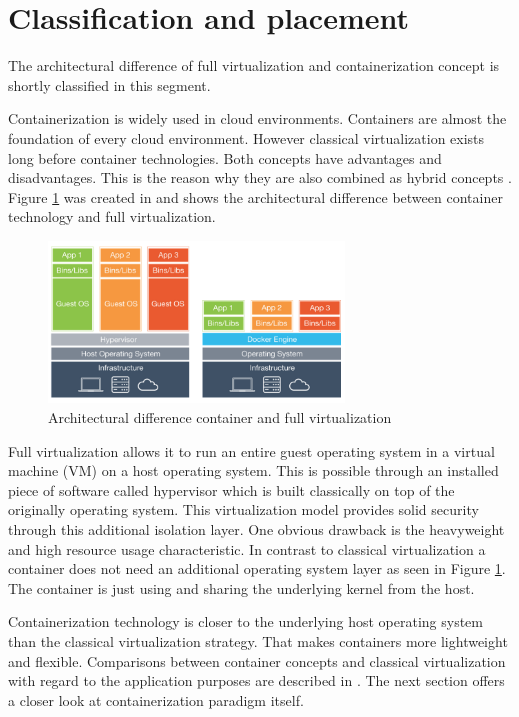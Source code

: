 \section{Classification and placement}
\label{sec:intro:virt_and_cont}
The architectural difference of full virtualization and containerization concept is shortly classified in this segment.

Containerization is widely used in cloud environments. Containers are almost the foundation of every cloud environment.
However classical virtualization exists long before container technologies.
Both concepts have advantages and disadvantages. 
This is the reason why they are also combined as hybrid concepts \cite{6498558}.
Figure \ref{fig:intro:diff_container_vm} was created in \cite{evol_cont} and shows the architectural difference between container technology and full virtualization.
 
\begin{figure}[htbp]
 \centering
 \includegraphics[width=0.7\textwidth]{gfx/examples/os_virt_diff}
 \caption{Architectural difference container and full virtualization}
 \label{fig:intro:diff_container_vm}
\end{figure}
Full virtualization allows it to run an entire guest operating system in a virtual machine (VM) on a host operating system. 
This is possible through an installed piece of software called hypervisor which is built classically on top of the originally operating system. 
This virtualization model provides solid security through this additional isolation layer. 
One obvious drawback is the heavyweight and high resource usage characteristic.
In contrast to classical virtualization a container does not need an additional operating system layer as seen in Figure \ref{fig:intro:diff_container_vm}. 
The container is just using and sharing the underlying kernel from the host. 

Containerization technology is closer to the underlying host operating system than the classical virtualization strategy. 
That makes containers more lightweight and flexible. 
Comparisons between container concepts and classical virtualization with regard to the application purposes are described in \cite{7921010}.
The next section offers a closer look at containerization paradigm itself.

